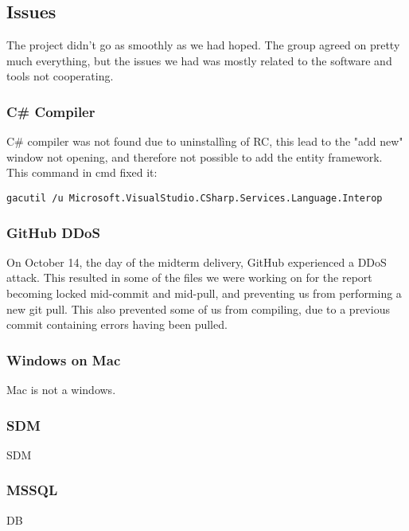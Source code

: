 \subsection{Issues}
The project didn't go as smoothly as we had hoped. The group agreed on pretty much everything, but the issues we had was mostly related to the software and tools not cooperating.

\subsubsection{C\# Compiler}
C\# compiler was not found due to uninstallìng of RC, this lead to the "add new" window not opening, and therefore not possible to add the entity framework.\\
This command in cmd fixed it:
\begin{verbatim}
gacutil /u Microsoft.VisualStudio.CSharp.Services.Language.Interop 
\end{verbatim}

\subsubsection{GitHub DDoS}
On October 14, the day of the midterm delivery, GitHub experienced a DDoS attack. This resulted in some of the files we were working on for the report becoming locked mid-commit and mid-pull, and preventing us from performing a new git pull. This also prevented some of us from compiling, due to a previous commit containing errors having been pulled.

\subsubsection{Windows on Mac}
Mac is not a windows.

\subsubsection{SDM}
SDM

\subsubsection{MSSQL}
DB


